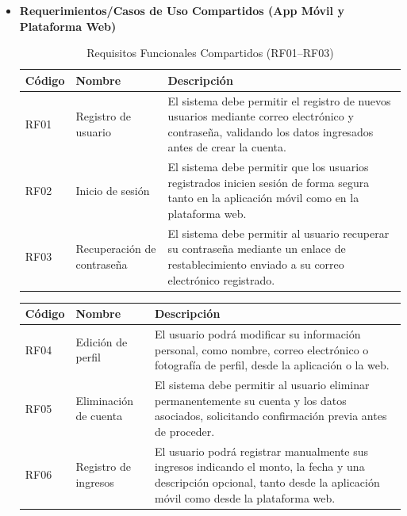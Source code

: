 \begin{itemize}
    \item \textbf{Requerimientos/Casos de Uso Compartidos (App Móvil y Plataforma Web)} 
        
    \begin{table}[H]
    \centering
    \renewcommand{\arraystretch}{1.2}
    \begin{tabularx}{\textwidth}{@{} l l X @{}}
    \toprule
    \textbf{Código} & \textbf{Nombre} & \textbf{Descripción} \\
    \midrule
    RF01 & Registro de usuario &
    El sistema debe permitir el registro de nuevos usuarios mediante correo electrónico y contraseña, validando los datos ingresados antes de crear la cuenta. \\

    RF02 & Inicio de sesión &
    El sistema debe permitir que los usuarios registrados inicien sesión de forma segura tanto en la aplicación móvil como en la plataforma web. \\

    RF03 & Recuperación de contraseña &
    El sistema debe permitir al usuario recuperar su contraseña mediante un enlace de restablecimiento enviado a su correo electrónico registrado. \\

    \bottomrule
    \end{tabularx}
    \caption{Requisitos Funcionales Compartidos (RF01–RF03)}
    \end{table}

    \begin{table}[H]
    \centering
    \renewcommand{\arraystretch}{1.2}
    \begin{tabularx}{\textwidth}{@{} l l X @{}}
    \toprule
    \textbf{Código} & \textbf{Nombre} & \textbf{Descripción} \\
    \midrule
    RF04 & Edición de perfil &
    El usuario podrá modificar su información personal, como nombre, correo electrónico o fotografía de perfil, desde la aplicación o la web. \\


    RF05 & Eliminación de cuenta &
    El sistema debe permitir al usuario eliminar permanentemente su cuenta y los datos asociados, solicitando confirmación previa antes de proceder. \\

    RF06 & Registro de ingresos &
    El usuario podrá registrar manualmente sus ingresos indicando el monto, la fecha y una descripción opcional, tanto desde la aplicación móvil como desde la plataforma web. \\


\end{tabularx}
\end{table}
\end{itemize}
